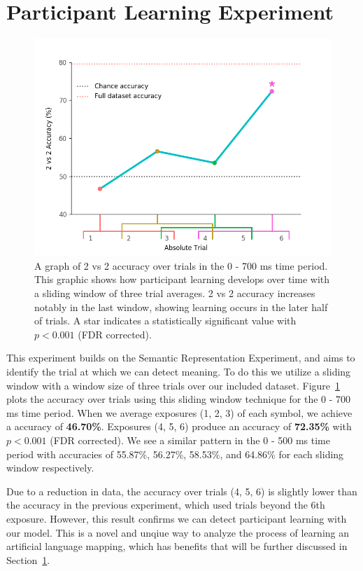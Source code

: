 \section{Participant Learning Experiment}
\label{sec:results:participantlearning}

\begin{figure}[t]
  \centering
  \includegraphics[width=0.75\linewidth]{figures/learning}
  \caption[\tvt Accuracy over Trials]{
    A graph of 2 vs 2 accuracy over trials in the 0 - 700 ms time period. This 
    graphic shows how participant learning develops over time with a sliding 
    window of three trial averages.  2 vs 2 accuracy increases notably in the 
    last window, showing learning occurs in the later half of trials. A star 
    indicates a statistically significant value with $p < 0.001$ (FDR 
    corrected).
  }
  \label{fig:learning}
\end{figure}

This experiment builds on the Semantic Representation Experiment, and aims to 
identify the trial at which we can detect meaning. To do this we utilize a 
sliding window with a window size of three trials over our included dataset.   
Figure~\ref{fig:learning} plots the \tvt accuracy over trials using this 
sliding window technique for the 0 - 700 ms time period. When we average 
exposures (1, 2, 3) of each symbol, we achieve a \tvt accuracy of 
\textbf{46.70\%}.  Exposures (4, 5, 6) produce an accuracy of \textbf{72.35\%} 
with $p < 0.001$ (FDR corrected). We see a similar pattern in the 0 - 500 ms 
time period with accuracies of 55.87\%, 56.27\%, 58.53\%, and 64.86\% for each 
sliding window respectively.

Due to a reduction in data, the \tvt accuracy over trials (4, 5, 6) is slightly 
lower than the \tvt accuracy in the previous experiment, which used trials 
beyond the 6th exposure. However, this result confirms we can detect 
participant learning with our model. This is a novel and unqiue way to analyze 
the process of learning an artificial language mapping, which has benefits that 
will be further discussed in Section~\ref{sec:results:participantlearning}.
